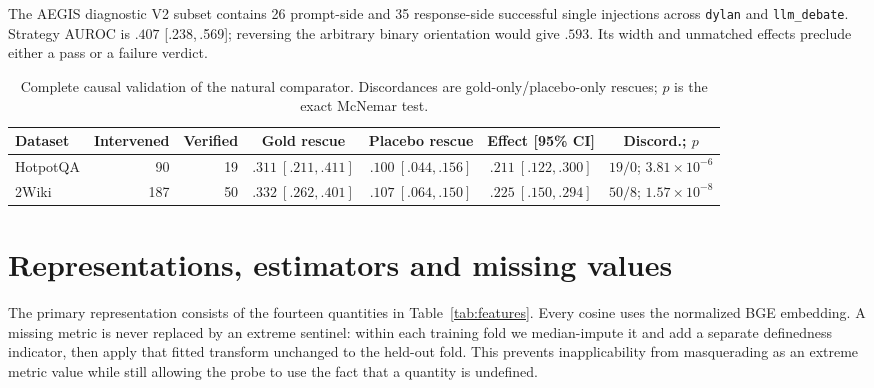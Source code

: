 \documentclass{article}
\newcommand{\ci}[2]{{\footnotesize[#1,\,#2]}}
\begin{document}
The AEGIS diagnostic V2 subset contains 26 prompt-side and 35 response-side successful
single injections across \texttt{dylan} and \texttt{llm\_debate}. Strategy AUROC is $.407$
\ci{.238}{.569}; reversing the arbitrary binary orientation would give $.593$. Its width and
unmatched effects preclude either a pass or a failure verdict.

\begin{table}[h]
\centering\scriptsize
\caption{Complete causal validation of the natural comparator. Discordances are
gold-only/placebo-only rescues; $p$ is the exact McNemar test.}
\label{tab:causal-full}
\begin{tabular}{@{}lrrcccc@{}}
\toprule
Dataset & Intervened & Verified & Gold rescue & Placebo rescue & Effect [95\% CI] & Discord.; $p$ \\
\midrule
HotpotQA & 90 & 19 & $.311\ [.211,.411]$ & $.100\ [.044,.156]$ & $.211\ [.122,.300]$ & $19/0$; $3.81\!\times\!10^{-6}$ \\
2Wiki & 187 & 50 & $.332\ [.262,.401]$ & $.107\ [.064,.150]$ & $.225\ [.150,.294]$ & $50/8$; $1.57\!\times\!10^{-8}$ \\
\bottomrule
\end{tabular}
\end{table}

\section{Representations, estimators and missing values}
\label{app:representations}

The primary representation consists of the fourteen quantities in
Table~\ref{tab:features}. Every cosine uses the normalized BGE embedding. A missing metric is
never replaced by an extreme sentinel: within each training fold we median-impute it and add
a separate definedness indicator, then apply that fitted transform unchanged to the held-out
fold. This prevents inapplicability from masquerading as an extreme metric value while still
allowing the probe to use the fact that a quantity is undefined.
\end{document}

